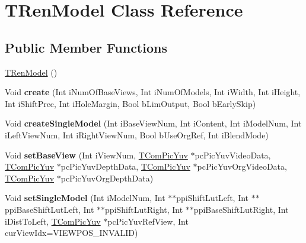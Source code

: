 \hypertarget{class_t_ren_model}{}\section{T\+Ren\+Model Class Reference}
\label{class_t_ren_model}
\subsection*{Public Member Functions}
\begin{DoxyCompactItemize}
\item 
\hyperlink{class_t_ren_model_a50bf8b561b598829d604c82d18638cce}{T\+Ren\+Model} ()
\item 
\mbox{\label{class_t_ren_model_ac17b5a7a2f7679eac538ad0967d224b2}} 
Void {\bfseries create} (Int i\+Num\+Of\+Base\+Views, Int i\+Num\+Of\+Models, Int i\+Width, Int i\+Height, Int i\+Shift\+Prec, Int i\+Hole\+Margin, Bool b\+Lim\+Output, Bool b\+Early\+Skip)
\item 
\mbox{\label{class_t_ren_model_ab55f38600c7907f21efe5d638f26aa57}} 
Void {\bfseries create\+Single\+Model} (Int i\+Base\+View\+Num, Int i\+Content, Int i\+Model\+Num, Int i\+Left\+View\+Num, Int i\+Right\+View\+Num, Bool b\+Use\+Org\+Ref, Int i\+Blend\+Mode)
\item 
\mbox{\label{class_t_ren_model_a5a61a7e853792aaf58949f9a56fd649d}} 
Void {\bfseries set\+Base\+View} (Int i\+View\+Num, \hyperlink{class_t_com_pic_yuv}{T\+Com\+Pic\+Yuv} $\ast$pc\+Pic\+Yuv\+Video\+Data, \hyperlink{class_t_com_pic_yuv}{T\+Com\+Pic\+Yuv} $\ast$pc\+Pic\+Yuv\+Depth\+Data, \hyperlink{class_t_com_pic_yuv}{T\+Com\+Pic\+Yuv} $\ast$pc\+Pic\+Yuv\+Org\+Video\+Data, \hyperlink{class_t_com_pic_yuv}{T\+Com\+Pic\+Yuv} $\ast$pc\+Pic\+Yuv\+Org\+Depth\+Data)
\item 
\mbox{\label{class_t_ren_model_a911f86a5b65025f6f6ec7be9b7bea43b}} 
Void {\bfseries set\+Single\+Model} (Int i\+Model\+Num, Int $\ast$$\ast$ppi\+Shift\+Lut\+Left, Int $\ast$$\ast$ppi\+Base\+Shift\+Lut\+Left, Int $\ast$$\ast$ppi\+Shift\+Lut\+Right, Int $\ast$$\ast$ppi\+Base\+Shift\+Lut\+Right, Int i\+Dist\+To\+Left, \hyperlink{class_t_com_pic_yuv}{T\+Com\+Pic\+Yuv} $\ast$pc\+Pic\+Yuv\+Ref\+View, Int cur\+View\+Idx=V\+I\+E\+W\+P\+O\+S\+\_\+\+I\+N\+V\+A\+L\+ID)
\item 

\end{DoxyCompactItemize}
